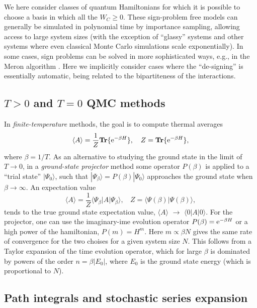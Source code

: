 \documentclass[range]{ar2e}
\begin{document}
We here consider classes of quantum Hamiltonians for which it is possible to choose a basis in which all 
the $W_C\geq 0$. These sign-problem free models can generally be simulated in polynomial time by 
importance sampling, allowing access to large system sizes (with the exception of ``glassy'' systems and
other systems where even classical Monte Carlo simulations scale exponentially). In some cases, sign problems
can be solved in more sophisticated ways, e.g., in the Meron algorithm \cite{Chandrasekharan99}. Here we 
implicitly consider cases where the ``de-signing'' is essentially automatic, being related to the bipartiteness 
of the interactions.
 
\subsection{$T>0$ and $T=0$ QMC methods}
\label{ss:method}

In {\it finite-temperature} methods, the goal is to compute thermal averages
\begin{equation}
\langle A\rangle = \frac{1}{Z}{\bf Tr}\{ {\rm e}^{-\beta H}\},~~~
Z = {\bf Tr}\{ {\rm e}^{-\beta H}\},
\label{za1}
\end{equation}
where $\beta=1/T$. As an alternative to studying the ground state in the limit of  $T\to 0$, in a {\it ground-state projector} method some 
operator $P(\beta)$  is applied to a ``trial state'' $|\Psi_0\rangle$, such that $|\Psi_\beta \rangle = P(\beta)|\Psi_0\rangle$ approaches the 
ground state when $\beta \to \infty$. An expectation value
\begin{equation}
\langle A\rangle = \frac{1}{Z}\langle \Psi_\beta|A|\Psi_\beta\rangle,~~~~ Z = \langle \Psi(\beta)|\Psi(\beta)\rangle,
\label{za2}
\end{equation}
tends to the true ground state expectation value, $\langle A\rangle$ $\to$ $\langle 0| A|0\rangle$. For the projector, one can use the imaginary-ime
evolution operator $P(\beta)={\rm e}^{-\beta H}$ or a high power of the hamiltonian, $P(m)=H^m$. Here $m \propto \beta N$ gives the same rate of 
convergence for the two choises for a given system size $N$. This follows from a Taylor expansion of the time evolution operator, which for large 
$\beta$ is dominated by powers of the order $n=\beta |E_0|$, where $E_0$ is the ground state energy (which is proportional to $N$).

\subsection{Path integrals and stochastic series expansion}
\end{document}
